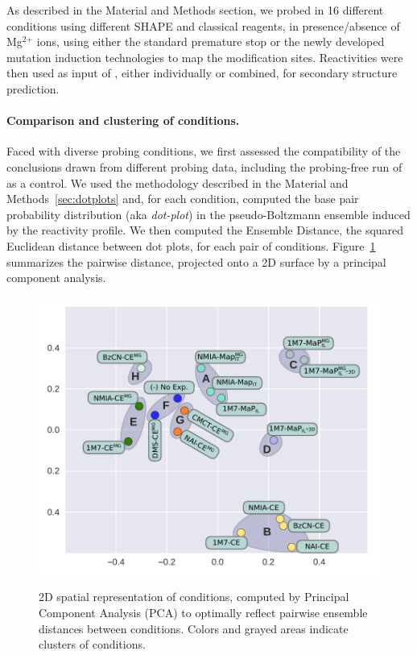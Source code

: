 \documentclass[a4,center,fleqn]{NAR}
\begin{document}
As described in the Material and Methods section, we probed \didy{}  in 16 different conditions using different SHAPE and classical reagents, in presence/absence of Mg$^\text{2+}$ ions, using either the standard premature stop or the newly developed mutation induction technologies to map the modification sites.  Reactivities were then used as input of \OurTool{}, either individually or combined,  for secondary structure prediction. 


\paragraph{Comparison and clustering of conditions.}
Faced with diverse probing conditions, we first assessed the compatibility of the conclusions drawn from different probing data, including the probing-free run of \OurTool as a control. We used the methodology described in the Material and Methods~\ref{sec:dotplots} and, for each condition, computed the base pair probability distribution (aka \emph{dot-plot}) in the  pseudo-Boltzmann ensemble induced by the reactivity profile. We then computed the Ensemble Distance, the squared Euclidean distance between dot plots, for each pair of conditions. Figure~\ref{fig:PCA} summarizes the pairwise distance, projected onto a 2D surface by a principal component analysis. 


\begin{figure}
	{\centering \includegraphics[width=\linewidth]{graphs/didy/PCA}\\}%
	
	\caption{2D spatial representation of conditions, computed by Principal Component Analysis (PCA) to optimally reflect pairwise ensemble distances between conditions. Colors and grayed areas indicate clusters of conditions.}\label{fig:PCA}
\end{figure}
\end{document}
